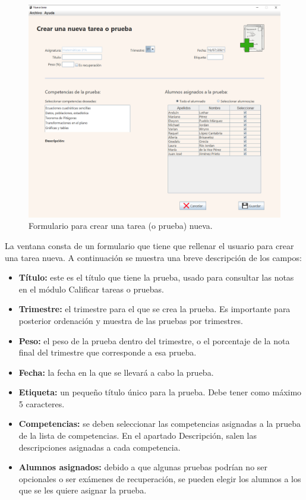 \begin{figure}[h]
\centering\includegraphics[width=1\linewidth]{figs/creartarea.png}
\caption{Formulario para crear una tarea (o prueba) nueva.}
\label{Fig:creartarea}
\end{figure}

La ventana consta de un formulario que tiene que rellenar el usuario para crear una tarea nueva. A continuación se muestra una breve descripción de los campos:
\begin{itemize}
	\item \textbf{Título:} este es el título que tiene la prueba, usado para consultar las notas en el módulo Calificar tareas o pruebas.
	\item \textbf{Trimestre:} el trimestre para el que se crea la prueba. Es importante para posterior ordenación y muestra de las pruebas por trimestres.
	\item \textbf{Peso:} el peso de la prueba dentro del trimestre, o el porcentaje de la nota final del trimestre que corresponde a esa prueba.
	\item \textbf{Fecha:} la fecha en la que se llevará a cabo la prueba.
	\item \textbf{Etiqueta:} un pequeño título único para la prueba. Debe tener como máximo 5 caracteres.
	\item \textbf{Competencias:} se deben seleccionar las competencias asignadas a la prueba de la lista de competencias. En el apartado Descripción, salen las descripciones asignadas a cada competencia.
	\item \textbf{Alumnos asignados:} debido a que algunas pruebas podrían no ser opcionales o ser exámenes de recuperación, se pueden elegir los alumnos a los que se les quiere asignar la prueba.
\end{itemize}

